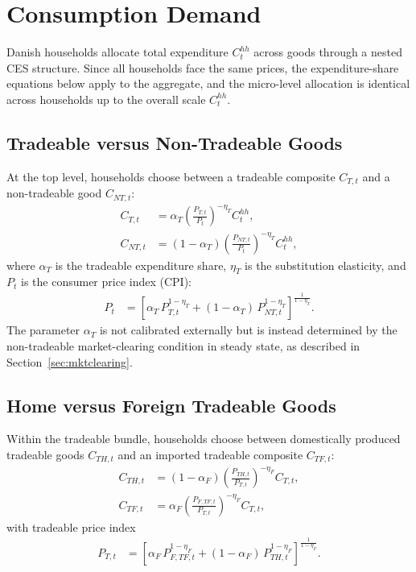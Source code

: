 \documentclass[12pt,a4paper]{article}
\begin{document}
\section{Consumption Demand}
\label{sec:demand}

Danish households allocate total expenditure $C^{hh}_t$ across goods through a nested CES structure. Since all households face the same prices, the expenditure-share equations below apply to the aggregate, and the micro-level allocation is identical across households up to the overall scale $C^{hh}_t$.

\subsection{Tradeable versus Non-Tradeable Goods}

At the top level, households choose between a tradeable composite $C_{T,t}$ and a non-tradeable good $C_{NT,t}$:
\begin{align}
    C_{T,t} &= \alpha_T \left(\frac{P_{T,t}}{P_t}\right)^{-\eta_T} C^{hh}_t,
    \label{eq:CT}\\
    C_{NT,t} &= (1-\alpha_T) \left(\frac{P_{NT,t}}{P_t}\right)^{-\eta_T} C^{hh}_t,
    \label{eq:CNT}
\end{align}
where $\alpha_T$ is the tradeable expenditure share, $\eta_T$ is the substitution elasticity, and $P_t$ is the consumer price index (CPI):
\begin{align}
    P_t &= \left[
        \alpha_T\,P_{T,t}^{1-\eta_T} + (1-\alpha_T)\,P_{NT,t}^{1-\eta_T}
    \right]^{\!\frac{1}{1-\eta_T}}.
    \label{eq:CPI}
\end{align}
The parameter $\alpha_T$ is not calibrated externally but is instead determined by the non-tradeable market-clearing condition in steady state, as described in Section~\ref{sec:mktclearing}.

\subsection{Home versus Foreign Tradeable Goods}

Within the tradeable bundle, households choose between domestically produced tradeable goods $C_{TH,t}$ and an imported tradeable composite $C_{TF,t}$:
\begin{align}
    C_{TH,t} &= (1-\alpha_F)\left(\frac{P_{TH,t}}{P_{T,t}}\right)^{-\eta_F} C_{T,t},
    \label{eq:CTH}\\
    C_{TF,t} &= \alpha_F\left(\frac{P_{F,TF,t}}{P_{T,t}}\right)^{-\eta_F} C_{T,t},
    \label{eq:CTF}
\end{align}
with tradeable price index
\begin{align}
    P_{T,t} &= \left[
        \alpha_F\,P_{F,TF,t}^{1-\eta_F} + (1-\alpha_F)\,P_{TH,t}^{1-\eta_F}
    \right]^{\!\frac{1}{1-\eta_F}}.
    \label{eq:PT}
\end{align}
\end{document}
